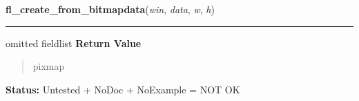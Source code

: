     \label{xformslib:library:fl_create_from_bitmapdata}

    \vspace{0.5ex}

\hspace{.8\funcindent}\begin{boxedminipage}{\funcwidth}

    \raggedright \textbf{fl\_create\_from\_bitmapdata}(\textit{win}, \textit{data}, \textit{w}, \textit{h})

    \vspace{-1.5ex}

    \rule{\textwidth}{0.5\fboxrule}
\setlength{\parskip}{2ex}
    {omitted fieldlist}
\setlength{\parskip}{1ex}
      \textbf{Return Value}
    \vspace{-1ex}

      \begin{quote}
      pixmap

      \end{quote}

\textbf{Status:} Untested + NoDoc + NoExample = NOT OK



    \end{boxedminipage}

    \label{xformslib:library:fl_create_pixmap}

    \vspace{0.5ex}

